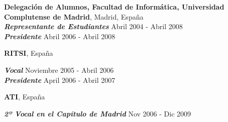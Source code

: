 \documentclass[margin,line]{resume}
\begin{document}
\begin{resume}
{\bf Delegación de Alumnos, Facultad de Informática, Universidad Complutense de
Madrid}, Madrid, España\\

\vspace{-.7cm}
{\bf \em Representante de Estudiantes} \hfill {Abril 2004 - Abril 2008}\\
{\bf \em Presidente} \hfill { Abril 2006 - Abril 2008}

{\bf RITSI}, España

\vspace{-.3cm}
{\bf \em Vocal} \hfill { Noviembre 2005 - Abril 2006}\\
{\bf \em Presidente} \hfill { April 2006 - Abril 2007}

{\bf ATI}, España

\vspace{-.3cm}
{\bf \em 2º Vocal en el Capítulo de Madrid} \hfill {%
  Nov 2006 - Dic 2009}\\

\end{resume}
\end{document}
